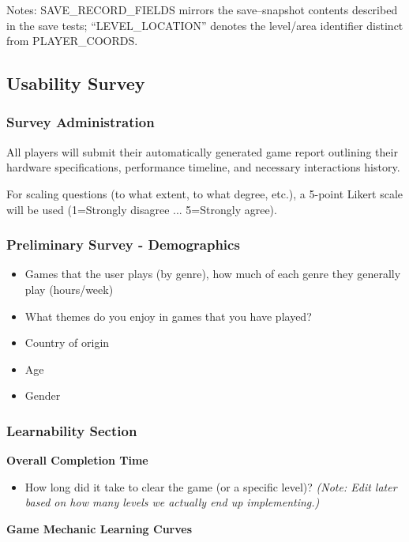 \documentclass[12pt, titlepage]{article}
\begin{document}
Notes: SAVE\_RECORD\_FIELDS mirrors the save--snapshot contents described in the save tests; “LEVEL\_LOCATION” denotes the level/area identifier distinct from PLAYER\_COORDS.
\subsection{Usability Survey}\label{Survey}

\subsubsection{Survey Administration}

All players will submit their automatically generated game report outlining their hardware specifications, performance timeline, and necessary interactions history.

For scaling questions (to what extent, to what degree, etc.), a 5-point Likert scale will be used (1=Strongly disagree ... 5=Strongly agree).

\subsubsection{Preliminary Survey - Demographics}

\begin{itemize}
  \item Games that the user plays (by genre), how much of each genre they generally play (hours/week)
  \item What themes do you enjoy in games that you have played?
  \item Country of origin
  \item Age
  \item Gender
\end{itemize}

\subsubsection{Learnability Section}

\textbf{Overall Completion Time}

\begin{itemize}
  \item How long did it take to clear the game (or a specific level)? \textit{(Note: Edit later based on how many levels we actually end up implementing.)}
\end{itemize}

\textbf{Game Mechanic Learning Curves}
\end{document}
